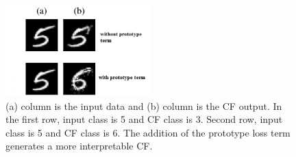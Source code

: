 
\begin{figure}
  \centering
  \includegraphics[width=0.5\textwidth]{proto.PNG}
  \caption{(a) column is the input data and (b) column is the CF output. In the first row, input class is 5 and CF class is 3. Second row, input class is 5 and CF class is 6. The addition of the prototype loss term generates a more interpretable CF.
  }
  \label{fig:protoresult}
\end{figure}

